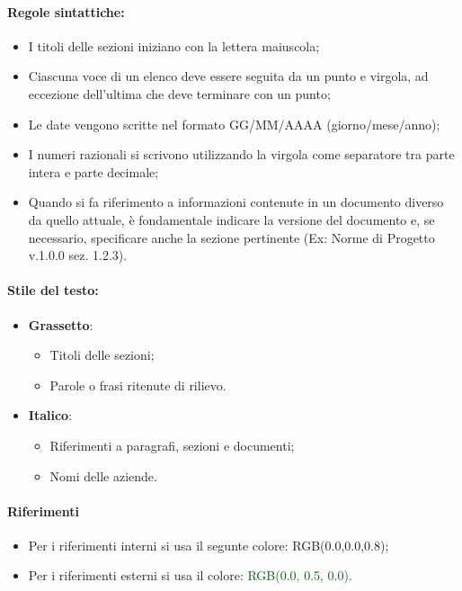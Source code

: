 \paragraph*{Regole sintattiche:}
\begin{itemize}
    \item I titoli delle sezioni iniziano con la lettera maiuscola;
    \item Ciascuna voce di un elenco deve essere seguita da un punto e virgola, ad eccezione dell'ultima che deve terminare con un punto;
    \item Le date vengono scritte nel formato GG/MM/AAAA (giorno/mese/anno);
    \item I numeri razionali si scrivono utilizzando la virgola come separatore tra parte intera e parte decimale;
    \item Quando si fa riferimento a informazioni contenute in un documento diverso da quello attuale, è fondamentale indicare la versione del documento e, se necessario, specificare anche la sezione pertinente (Ex: Norme di Progetto v.1.0.0 sez. 1.2.3).
\end{itemize}

\paragraph*{Stile del testo:}
\begin{itemize}
    \item \textbf{Grassetto}:
    \begin{itemize}
        \item Titoli delle sezioni;
        \item Parole o frasi ritenute di rilievo.
    \end{itemize}
    \item \textbf{Italico}:
    \begin{itemize}
        \item Riferimenti a paragrafi, sezioni e documenti;
        \item Nomi delle aziende.
    \end{itemize}
\end{itemize}

\paragraph*{Riferimenti}
    \begin{itemize}
        \item Per i riferimenti interni si usa il segunte colore: \textcolor{navyblue}{RGB(0.0,0.0,0.8)};
        \item Per i riferimenti esterni si usa il colore: \textcolor{darkgreen}{RGB(0.0, 0.5, 0.0)}.
\end{itemize}

